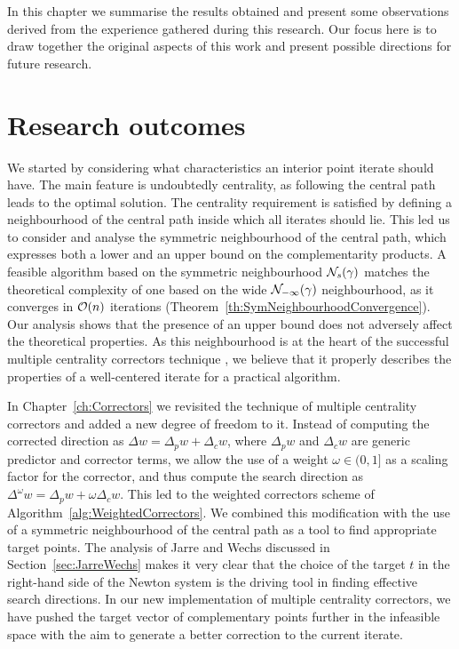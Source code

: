 
%
%
\label{ch:Conclusions}

In this chapter we summarise the results obtained and 
present some observations derived from the experience
gathered during this research.
Our focus here is to draw together the original aspects of this work
and present possible directions for future research.

%
%
\section{Research outcomes}

We started by considering what characteristics an interior point iterate
should have. The main feature is undoubtedly centrality, as following
the central path leads to the optimal solution.
The centrality requirement is satisfied by defining a neighbourhood
of the central path inside which all iterates should lie.
This led us to consider and analyse the symmetric neighbourhood
of the central path, which expresses both a lower and an upper bound
on the complementarity products.
A feasible algorithm based on the symmetric neighbourhood $\mathcal{N}_s(\gamma)$
matches the theoretical complexity of one based on the wide
$\mathcal{N}_{-\infty}(\gamma)$ neighbourhood, as it converges
in $\mathcal{O}(n)$ iterations (Theorem~\ref{th:SymNeighbourhoodConvergence}).
Our analysis shows that the presence of an upper bound does not
adversely affect the theoretical properties.
As this neighbourhood is at the heart of the successful multiple
centrality correctors technique \cite{Gondzio96}, we believe that
it properly describes
the properties of a well-centered iterate for a practical algorithm.

In Chapter~\ref{ch:Correctors} we revisited the 
technique of multiple centrality correctors
and added a new degree of freedom to it. 
Instead of computing the corrected direction as
$\Delta w = \Delta_p w + \Delta_c w$, where 
$\Delta_p w$ and $\Delta_c w$ are generic predictor and corrector terms, 
we allow the use of a weight $\omega \in (0,1]$ as a scaling factor
for the corrector, and thus compute the search direction as
$\Delta^\omega w = \Delta_p w + \omega \Delta_c w$.
This led to the weighted correctors scheme of
Algorithm~\ref{alg:WeightedCorrectors}.
We combined this modification with the use of a symmetric neighbourhood
of the central path as a tool to find appropriate target points.
The analysis of Jarre and Wechs \cite{JarreWechs}
discussed in Section~\ref{sec:JarreWechs}
makes it very clear that the choice of the target $t$ in
the right-hand side of the Newton system is the driving
tool in finding effective search directions.
In our new implementation of multiple centrality correctors, we
have pushed the target vector of complementary points further
in the infeasible space with the aim to generate a better
correction to the current iterate.

